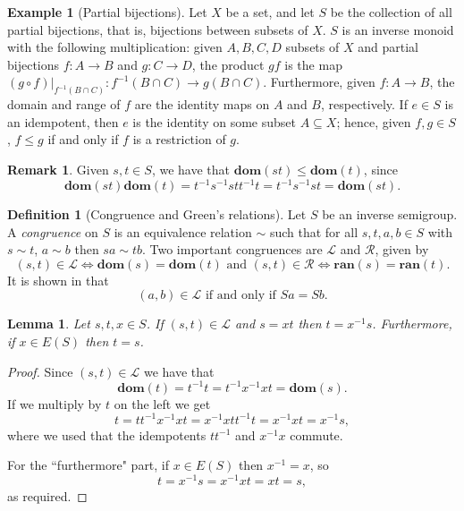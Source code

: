 \documentclass[svgnames]{amsart}
\theoremstyle{plain}
\newtheorem{lem}[thm]{Lemma}
\theoremstyle{definition}
\newtheorem{defn}[thm]{Definition}
\newtheorem{rem}[thm]{Remark}
\newtheorem{ex}[thm]{Example}
\newcommand{\dom}[1]{\mathbf{dom}\left(#1\right)}
\newcommand{\ran}[1]{\mathbf{ran}\left(#1\right)}
\begin{document}
\begin{ex}[Partial bijections] \label{example: partial}
	Let $X$ be a set, and let $S$ be the collection of all partial bijections, that is, bijections between subsets of $X$. $S$ is an inverse monoid with the following multiplication: given $A,B,C,D$ subsets of $X$ and partial bijections $f\colon A\to B$ and $g\colon C\to D$, the product $gf$ is the map $(g\circ f)|_{f^{-1}(B\cap C)} \colon  f^{-1}(B\cap C)\to g(B\cap C)$.  Furthermore, given $f\colon A\to B$, the domain and range of $f$ are the identity maps on $A$ and $B$, respectively. If $e\in S$ is an idempotent, then $e$ is the identity on some subset $A\subseteq X$; hence, given $f,g\in S$, $f\le g$ if and only if $f$ is a restriction of $g$.
\end{ex}



\begin{rem}\label{rem:order_under_products}
	Given $s,t\in S$, we have that $\dom{st}\le \dom{t}$, since
	$$\dom{st}\dom{t}=t^{-1}s^{-1}stt^{-1}t=t^{-1}s^{-1}st=\dom{st}.$$
\end{rem}

\begin{defn}[Congruence and Green's relations]
    Let $S$ be an inverse semigroup. A \emph{congruence} on $S$ is an equivalence relation
    $\sim$ such that for all $s,t,a,b \in S$ with $s \sim t$, $a \sim b$ then $sa \sim tb$.
    Two important congruences are
	$\mathcal{L}$ and $\mathcal{R}$, given  by
	\[
		(s,t) \in \mathcal{L} \iff \dom{s}= \dom{t} \mbox{ and } (s,t) \in \mathcal{R} \iff \ran{s}=\ran{t}.
	\]
    It is shown in \cite{LawsonBook} that
    \[
		(a,b) \in \mathcal{L} \text{ if and only if } Sa = Sb
	.\]
\end{defn}

\begin{lem}\label{lem:edge_in_pairs}
   Let $s,t,x\in S$. If $(s,t)\in \mathcal{L}$ and $s=xt$ then $t=x^{-1}s$. Furthermore, if $x\in E(S)$ then $t=s$.
\end{lem}

\begin{proof}
    Since $(s,t)\in \mathcal{L}$ we have that 
    $$\dom{t}=t^{-1}t=t^{-1}x^{-1}xt=\dom{s}.$$
    If we multiply by $t$ on the left we get
    $$t=tt^{-1}x^{-1}xt=x^{-1}xtt^{-1}t=x^{-1}xt=x^{-1}s,$$
    where we used that the idempotents $tt^{-1}$ and $x^{-1}x$ commute. 
    
    For the ``furthermore" part, if $x\in E(S)$ then $x^{-1}=x$, so
    $$t=x^{-1}s=x^{-1}xt=xt=s,$$
    as required.
\end{proof}
\end{document}
